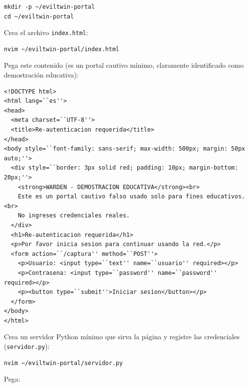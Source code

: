 \documentclass[11pt,a4paper]{article}
\begin{document}
\begin{lstlisting}
mkdir -p ~/eviltwin-portal
cd ~/eviltwin-portal
\end{lstlisting}

Crea el archivo \texttt{index.html}:

\begin{lstlisting}
nvim ~/eviltwin-portal/index.html
\end{lstlisting}

Pega este contenido (es un portal cautivo mínimo, claramente identificado
como demostración educativa):

\begin{lstlisting}
<!DOCTYPE html>
<html lang=``es''>
<head>
  <meta charset=``UTF-8''>
  <title>Re-autenticacion requerida</title>
</head>
<body style=``font-family: sans-serif; max-width: 500px; margin: 50px auto;''>
  <div style=``border: 3px solid red; padding: 10px; margin-bottom: 20px;''>
    <strong>WARDEN - DEMOSTRACION EDUCATIVA</strong><br>
    Este es un portal cautivo falso usado solo para fines educativos.<br>
    No ingreses credenciales reales.
  </div>
  <h1>Re-autenticacion requerida</h1>
  <p>Por favor inicia sesion para continuar usando la red.</p>
  <form action=``/captura'' method=``POST''>
    <p>Usuario: <input type=``text'' name=``usuario'' required></p>
    <p>Contrasena: <input type=``password'' name=``password'' required></p>
    <p><button type=``submit''>Iniciar sesion</button></p>
  </form>
</body>
</html>
\end{lstlisting}

Crea un servidor Python mínimo que sirva la página y registre las
credenciales (\texttt{servidor.py}):

\begin{lstlisting}
nvim ~/eviltwin-portal/servidor.py
\end{lstlisting}

Pega:
\end{document}
